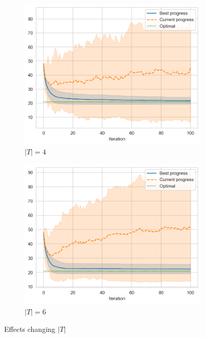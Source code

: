 \begin{figure}[ht]
    \hfill
    \begin{subfigure}{0.45\textwidth}
        \centering
        \includegraphics[width=\textwidth]{../images/p1/added44s.png}
        \caption{\(|T| = 4\)}
    \end{subfigure}
    \hfill
    \begin{subfigure}{0.45\textwidth}
        \centering
        \includegraphics[width=\textwidth]{../images/p1/added64s.png}
        \caption{\(|T| = 6\)}
    \end{subfigure}
    \hfill

    \caption{Effects changing \(|T|\)}
    \label{fig:p1-change-tenure}
\end{figure}

